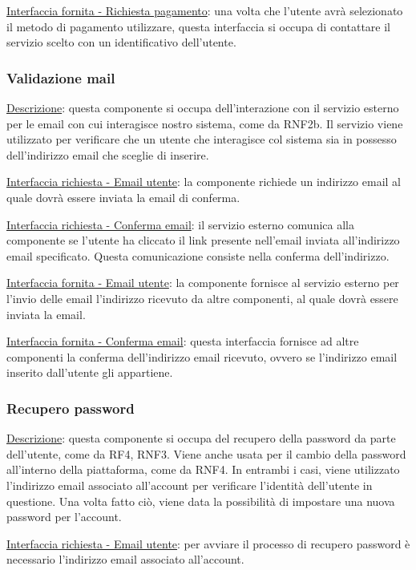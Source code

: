 \documentclass[a4paper,12pt]{article}
\begin{document}
\underline{Interfaccia fornita - Richiesta pagamento}: una volta che l’utente avrà selezionato il metodo di pagamento utilizzare, questa interfaccia si occupa di contattare il servizio scelto con un identificativo dell’utente.

\subsubsection{Validazione mail}

\underline{Descrizione}: questa componente si occupa dell’interazione con il servizio esterno per le email con cui interagisce nostro sistema, come da RNF2b. Il servizio viene utilizzato per verificare che un utente che interagisce col sistema sia in possesso dell’indirizzo email che sceglie di inserire.

\underline{Interfaccia richiesta - Email utente}: la componente richiede un indirizzo email al quale dovrà essere inviata la email di conferma.

\underline{Interfaccia richiesta - Conferma email}: il servizio esterno comunica alla componente se l’utente ha cliccato il link presente nell’email inviata all’indirizzo email specificato. Questa comunicazione consiste nella conferma dell’indirizzo.

\underline{Interfaccia fornita - Email utente}: la componente fornisce al servizio esterno per l’invio delle email l’indirizzo ricevuto da altre componenti, al quale dovrà essere inviata la email.

\underline{Interfaccia fornita - Conferma email}: questa interfaccia fornisce ad altre componenti la conferma dell’indirizzo email ricevuto, ovvero se l’indirizzo email inserito dall’utente gli appartiene.

\subsubsection{Recupero password}

\underline{Descrizione}: questa componente si occupa del recupero della password da parte dell’utente, come da RF4, RNF3. Viene anche usata per il cambio della password all’interno della piattaforma, come da RNF4. In entrambi i casi, viene utilizzato l’indirizzo email associato all’account per verificare l’identità dell’utente in questione. Una volta fatto ciò, viene data la possibilità di impostare una nuova password per l’account.

\underline{Interfaccia richiesta - Email utente}: per avviare il processo di recupero password è necessario l’indirizzo email associato all’account.
\end{document}
